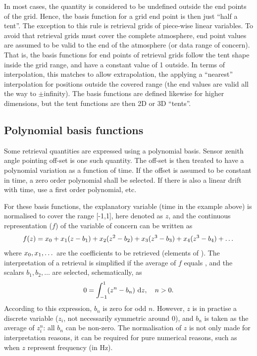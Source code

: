 In most cases, the quantity is considered to be undefined outside the end
points of the grid. Hence, the basis function for a grid end point is then just
``half a tent''. The exception to this rule is retrieval grids of piece-wise
linear variables. To avoid that retrieval grids must cover the complete
atmosphere, end point values are assumed to be valid to the end of the
atmosphere (or data range of concern). That is, the basis functions for end
points of retrieval grids follow the tent shape inside the grid range, and
have a constant value of 1 outside. In terms of interpolation, this matches to
allow extrapolation, the applying a ``nearest'' interpolation for positions
outside the covered range (the end values are valid all the way to
$\pm$infinity).
The basis functions are defined likewise for higher dimensions, but the
tent functions are then 2D or 3D ``tents''.




\subsection{Polynomial basis functions}
\label{sec:wfuns:basis2}
%
Some retrieval quantities are expressed using a polynomial basis. Sensor zenith
angle pointing off-set is one such quantity. The off-set is then treated to
have a polynomial variation as a function of time. If the offset is assumed to
be constant in time, a zero order polynomial shall be selected. If there is
also a linear drift with time, use a first order polynomial, etc.

For these basis functions, the explanatory variable (time in the example above)
is normalised to cover the range [-1,1], here denoted as $z$, and the
continuous representation ($f$) of the variable of concern can be written as
\begin{equation}
  f(z) = x_{0} + x_{1}(z-b_1) + x_{2}(z^2-b_2) + 
                     x_{3}(z^3-b_3) + x_{4}(z^3-b_4) + \dots  
\end{equation}
where $x_{0}, x_{1}, \dots$ are the coefficients to be retrieved
(elements of \SttVct). The interpretation of a retrieval is simplified if the
average of $f$ equals , and the scalars $b_1, b_2, \dots$ are
selected, schematically, as
\begin{equation}
  0 = \int_{-1}^1 \!\left(z^n-b_n\right) \, \mathrm{d} z, \quad n>0.
\end{equation}
According to this expression, $b_n$ is zero for odd $n$. However, $z$ is in
practise a discrete variable ($z_i$, not necessarily symmetric around 0), and
$b_n$ is taken as the average of $z_i^n$: all $b_n$ can be non-zero. The
normalisation of $z$ is not only made for interpretation reasons, it can be
required for pure numerical reasons, such as when $z$ represent frequency (in
Hz).

